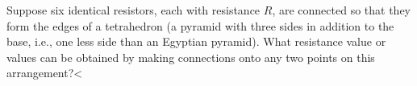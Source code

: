 Suppose six identical resistors, each with resistance
$R$, are connected so that they form the edges of a
tetrahedron (a pyramid with three sides in addition to the
base, i.e., one less side than an Egyptian pyramid). What
resistance value or values can be obtained by making
connections onto any two points on this arrangement?<%
